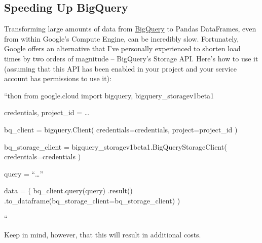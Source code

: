 \documentclass{article}
\begin{document}
\hypertarget{speeding_up_bigquery}{}\subsection*{{Speeding Up BigQuery}}\label{speeding_up_bigquery}

Transforming large amounts of data from \href{https://cloud.google.com/bigquery}{BigQuery} to Pandas DataFrames, even from within Google's Compute Engine, can be incredibly slow. Fortunately, Google offers an alternative that I've personally experienced to shorten load times by two orders of magnitude -- BigQuery's Storage API. Here's how to use it (assuming that this API has been enabled in your project and your service account has permissions to use it):

``thon from google.cloud import bigquery, bigquery\_storagev1beta1

credentials, project\_id = \ldots{}

bq\_client = bigquery.Client( credentials=credentials, project=project\_id )

bq\_storage\_client = bigquery\_storagev1beta1.BigQueryStorageClient( credentials=credentials )

query = ``\ldots{}''

data = ( bq\_client.query(query) .result() .to\_dataframe(bq\_storage\_client=bq\_storage\_client) )

``

Keep in mind, however, that this will result in additional costs.
\end{document}
